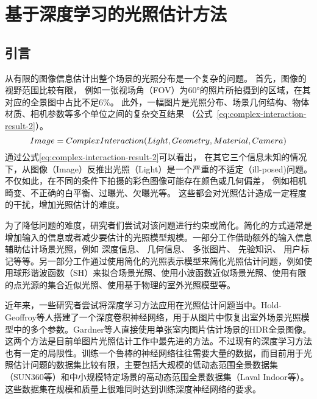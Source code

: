 \chapter{基于深度学习的光照估计方法}\label{chap:illumination-estimation}
\section{引言}
从有限的图像信息估计出整个场景的光照分布是一个复杂的问题。
首先，图像的视野范围比较有限，
例如一张视场角（FOV）为60°的照片所拍摄到的区域，在其对应的全景图中占比不足6\%。
此外，一幅图片是光照分布、场景几何结构、物体材质、相机参数等多个单位之间的复杂交互结果
（公式~\ref{eq:complex-interaction-result-2}）。
\begin{equation} \centering \label{eq:complex-interaction-result-2}
Image = ComplexInteraction(Light, Geometry, Material, Camera)\end{equation}
通过公式\ref{eq:complex-interaction-result-2}可以看出，
在其它三个信息未知的情况下，从图像（Image）反推出光照（Light）是一个严重的不适定（ill-posed)问题。
不仅如此，在不同的条件下拍摄的彩色图像可能存在颜色或几何偏差，
例如相机畸变、不正确的白平衡、过曝光、欠曝光等。
这些都会对光照估计造成一定程度的干扰，增加光照估计的难度。

为了降低问题的难度，研究者们尝试对该问题进行约束或简化。简化的方式通常是增加输入的信息或者减少要估计的光照模型规模。一部分工作借助额外的输入信息辅助估计场景光照，例如
深度信息\cite{knecht2012reciprocal,meilland20133d,zhang2016emptying,barron2013intrinsic}、
几何信息\cite{ramamoorthi2001signal,sato2003illumination,li2003multiple}、
多张图片\cite{sato1999acquiring,nishino2001determining,yu2006sparse}、
先验知识\cite{nishino2004eyes,barron2015shape,lopez2010compositing}、
用户标记\cite{lopez2010compositing,karsch2011rendering}等等。另一部分工作通过使用简化的光照表示模型来简化光照估计问题，例如使用球形谐波函数（SH）来拟合场景光照\cite{ramamoorthi2001signal,kemelmacher20113d,garrido2013reconstructing, knorr2014real,
li2014intrinsic,barron2015shape, rematas2016deep}、使用小波函数近似场景光照\cite{okabe2004spherical}、使用有限的点光源的集合近似光照\cite{sato1999acquiring,  panagopoulos2011illumination, wang2002estimation, li2003multiple, sato2003illumination}、使用基于物理的室外光照模型\cite{lalonde2008does, lalonde2010sun, lalonde2012estimating, sunkavalli2008color}等。

近年来，一些研究者尝试将深度学习方法应用在光照估计问题当中。Hold-Geoffroy等人\cite{hold2017deep}搭建了一个深度卷积神经网络，用于从图片中恢复出室外场景光照模型中的多个参数。Gardner等人\cite{gardner2017learning}直接使用单张室内图片估计场景的HDR全景图像。这两个方法是目前单图片光照估计工作中最先进的方法。不过现有的深度学习方法也有一定的局限性。训练一个鲁棒的神经网络往往需要大量的数据，而目前用于光照估计问题的数据集比较有限，主要包括大规模的低动态范围全景数据集（SUN360\cite{xiao2012recognizing}等）和中小规模特定场景的高动态范围全景数据集（Laval Indoor等\cite{gardner2017learning}）。这些数据集在规模和质量上很难同时达到训练深度神经网络的要求。


